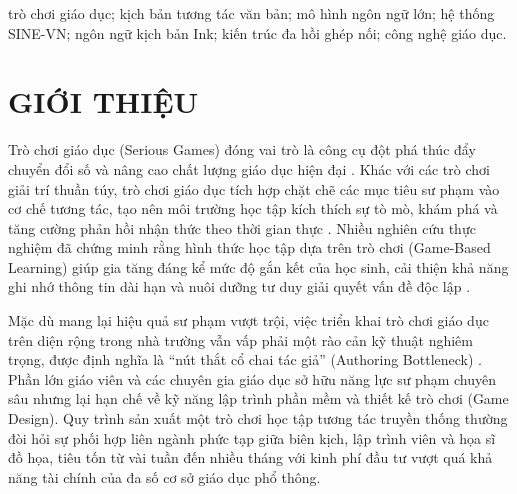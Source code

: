 \documentclass[conference]{IEEEtran}
\begin{document}
\begin{IEEEkeywords}
trò chơi giáo dục; kịch bản tương tác văn bản; mô hình ngôn ngữ lớn; hệ thống SINE-VN; ngôn ngữ kịch bản Ink; kiến trúc đa hồi ghép nối; công nghệ giáo dục.
\end{IEEEkeywords}

\section{GIỚI THIỆU}
Trò chơi giáo dục (Serious Games) đóng vai trò là công cụ đột phá thúc đẩy chuyển đổi số và nâng cao chất lượng giáo dục hiện đại \cite{rogosch2026}. Khác với các trò chơi giải trí thuần túy, trò chơi giáo dục tích hợp chặt chẽ các mục tiêu sư phạm vào cơ chế tương tác, tạo nên môi trường học tập kích thích sự tò mò, khám phá và tăng cường phản hồi nhận thức theo thời gian thực \cite{connolly2012}. Nhiều nghiên cứu thực nghiệm đã chứng minh rằng hình thức học tập dựa trên trò chơi (Game-Based Learning) giúp gia tăng đáng kể mức độ gắn kết của học sinh, cải thiện khả năng ghi nhớ thông tin dài hạn và nuôi dưỡng tư duy giải quyết vấn đề độc lập \cite{horn2025}.

Mặc dù mang lại hiệu quả sư phạm vượt trội, việc triển khai trò chơi giáo dục trên diện rộng trong nhà trường vẫn vấp phải một rào cản kỹ thuật nghiêm trọng, được định nghĩa là ``nút thắt cổ chai tác giả'' (Authoring Bottleneck) \cite{horn2025}. Phần lớn giáo viên và các chuyên gia giáo dục sở hữu năng lực sư phạm chuyên sâu nhưng lại hạn chế về kỹ năng lập trình phần mềm và thiết kế trò chơi (Game Design). Quy trình sản xuất một trò chơi học tập tương tác truyền thống thường đòi hỏi sự phối hợp liên ngành phức tạp giữa biên kịch, lập trình viên và họa sĩ đồ họa, tiêu tốn từ vài tuần đến nhiều tháng với kinh phí đầu tư vượt quá khả năng tài chính của đa số cơ sở giáo dục phổ thông.
\end{document}
